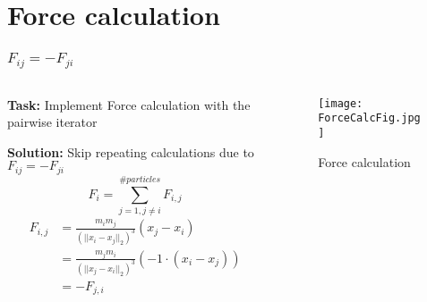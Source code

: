\section{Force calculation}

\begin{frame}
    \frametitle{$F_{ij} = -F_{ji}$}

    \begin{columns}
        \begin{column}{0.5\textwidth}
            \textbf{Task:} Implement Force calculation with the pairwise iterator

            \textbf{Solution:} Skip repeating calculations due to $F_{ij} = -F_{ji}$
            \begin{equation}
                F_i = \sum_{j=1, j \neq i}^{\#particles} F_{i,j}
            \end{equation}
            \begin{align}
                F_{i,j} &= \frac{m_im_j}{(||x_i-x_j||_2)^3} (x_j - x_i) \\
                        &= \frac{m_jm_i}{(||x_j-x_i||_2)^3} \left(-1 \cdot \left(x_i - x_j\right)\right) \\
                        &= - F_{j,i}
            \end{align}
        \end{column}
        \begin{column}{0.5\textwidth}
            \begin{figure}[]
                \centering
                \texttt{[image: ForceCalcFig.jpg]}
                \caption{Force calculation}
            \end{figure}
        \end{column}
    \end{columns}

    
\end{frame}